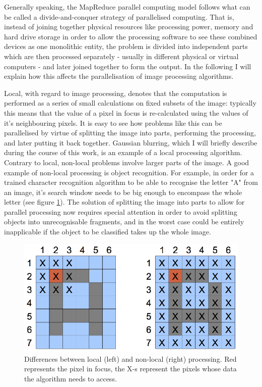 \documentclass [12pt,a4paper]{report}
\begin{document}
Generally speaking, the MapReduce parallel computing model follows what can be called a divide-and-conquer strategy of parallelised computing. That is, instead of joining together physical resources like processing power, memory and hard drive storage in order to allow the processing software to see these combined devices as one monolithic entity, the problem is divided into independent parts which are then processed separately - usually in different physical or virtual computers - and later joined together to form the output. In the following I will explain how this affects the parallelisation of image processing algorithms.

Local, with regard to image processing, denotes that the computation is performed as a series of small calculations on fixed subsets of the image: typically this means that the value of a pixel in focus is re-calculated using the values of it's neighbouring pixels. It is easy to see how problems like this can be parallelised by virtue of splitting the image into parts, performing the processing, and later putting it back together. Gaussian blurring, which I will briefly describe during the course of this work, is an example of a local processing algorithm. Contrary to local, non-local problems involve larger parts of the image. A good example of non-local processing is object recognition. For example, in order for a trained character recognition algorithm to be able to recognise the letter "A" from an image, it's search window needs to be big enough to encompass the whole letter (see figure \ref{fig_local_nonlocal}). The solution of splitting the image into parts to allow for parallel processing now requires special attention in order to avoid splitting objects into unrecognisable fragments, and in the worst case could be entirely inapplicable if the object to be classified takes up the whole image.

\begin{figure}[h]
\begin{center}
\includegraphics[]{local_nonlocal.eps} %
\caption{Differences between local (left) and non-local (right) processing. Red represents the pixel in focus, the X-s represent the pixels whose data the algorithm needs to access.}
\label{fig_local_nonlocal}
\end{center}
\end{figure}
\end{document}
